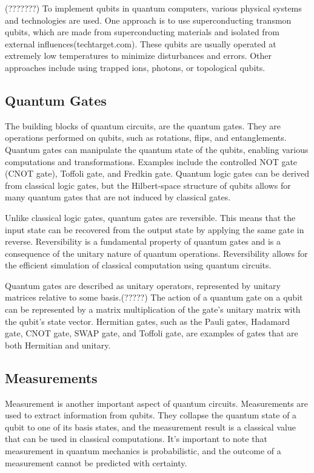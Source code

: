 \documentclass[pra,onecolumn,superscriptaddress]{revtex4}%
\begin{document}
(???????)
To implement qubits in quantum computers, various physical systems and technologies are used. One approach is to use superconducting transmon qubits, which are made from superconducting materials and isolated from external influences(techtarget.com). These qubits are usually operated at extremely low temperatures to minimize disturbances and errors. Other approaches include using trapped ions, photons, or topological qubits.

\subsection{Quantum Gates}

The building blocks of quantum circuits, are the quantum gates. They are operations performed on qubits, such as rotations, flips, and entanglements. Quantum gates can manipulate the quantum state of the qubits, enabling various computations and transformations. Examples include the controlled NOT gate (CNOT gate), Toffoli gate, and Fredkin gate. Quantum logic gates can be derived from classical logic gates, but the Hilbert-space structure of qubits allows for many quantum gates that are not induced by classical gates.

Unlike classical logic gates, quantum gates are reversible. This means that the input state can be recovered from the output state by applying the same gate in reverse. Reversibility is a fundamental property of quantum gates and is a consequence of the unitary nature of quantum operations. Reversibility allows for the efficient simulation of classical computation using quantum circuits.

Quantum gates are described as unitary operators, represented by unitary matrices relative to some basis.(?????) The action of a quantum gate on a qubit can be represented by a matrix multiplication of the gate's unitary matrix with the qubit's state vector. Hermitian gates, such as the Pauli gates, Hadamard gate, CNOT gate, SWAP gate, and Toffoli gate, are examples of gates that are both Hermitian and unitary.

\subsection{Measurements}

Measurement is another important aspect of quantum circuits. Measurements are used to extract information from qubits. They collapse the quantum state of a qubit to one of its basis states, and the measurement result is a classical value that can be used in classical computations. It's important to note that measurement in quantum mechanics is probabilistic, and the outcome of a measurement cannot be predicted with certainty.
\end{document}
